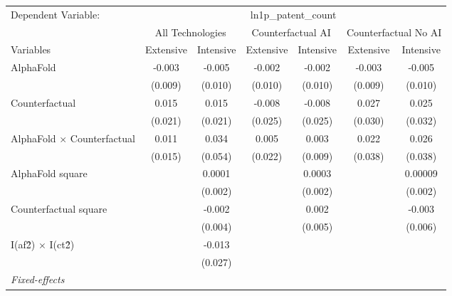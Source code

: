 \begingroup
\centering
\begin{tabular}{lcccccc}
   \tabularnewline \midrule \midrule
   Dependent Variable: & \multicolumn{6}{c}{ln1p\_patent\_count}\\
 & \multicolumn{2}{c}{All Technologies} & \multicolumn{2}{c}{Counterfactual AI} & \multicolumn{2}{c}{Counterfactual No AI} \\
\cmidrule(lr){1-1}\cmidrule(lr){2-3} \cmidrule(lr){4-5} \cmidrule(lr){6-7}
Variables & \multicolumn{1}{c}{Extensive} & \multicolumn{1}{c}{Intensive} & \multicolumn{1}{c}{Extensive} & \multicolumn{1}{c}{Intensive} & \multicolumn{1}{c}{Extensive} & \multicolumn{1}{c}{Intensive} \\
\cmidrule(lr){1-1}\cmidrule(lr){2-2} \cmidrule(lr){3-3} \cmidrule(lr){4-4} \cmidrule(lr){5-5} \cmidrule(lr){6-6} \cmidrule(lr){7-7}
   AlphaFold                          & -0.003  & -0.005  & -0.002  & -0.002  & -0.003  & -0.005\\   
                                      & (0.009) & (0.010) & (0.010) & (0.010) & (0.009) & (0.010)\\   
   Counterfactual                     & 0.015   & 0.015   & -0.008  & -0.008  & 0.027   & 0.025\\   
                                      & (0.021) & (0.021) & (0.025) & (0.025) & (0.030) & (0.032)\\   
   AlphaFold $\times$ Counterfactual  & 0.011   & 0.034   & 0.005   & 0.003   & 0.022   & 0.026\\   
                                      & (0.015) & (0.054) & (0.022) & (0.009) & (0.038) & (0.038)\\   
   AlphaFold square                   &         & 0.0001  &         & 0.0003  &         & 0.00009\\   
                                      &         & (0.002) &         & (0.002) &         & (0.002)\\   
   Counterfactual square              &         & -0.002  &         & 0.002   &         & -0.003\\   
                                      &         & (0.004) &         & (0.005) &         & (0.006)\\   
   I(af\^2) $\times$ I(ct\^2)         &         & -0.013  &         &         &         &   \\   
                                      &         & (0.027) &         &         &         &   \\   
   \midrule
   \emph{Fixed-effects}\\

\end{tabular}

